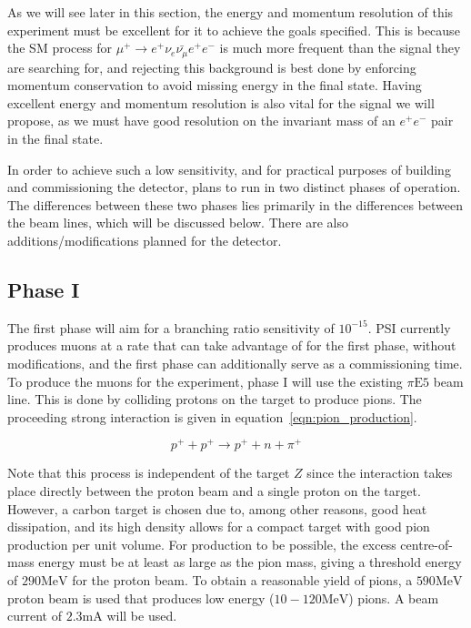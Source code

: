 As we will see later in this section, the energy and momentum resolution of this experiment must be excellent for it to achieve the goals specified.
This is because the SM process for $\mu^+ \rightarrow e^+ \nu_e \bar{\nu_\mu} e^+ e^-$ is much more frequent than the signal they are searching for, and rejecting this background is best done by enforcing momentum conservation to avoid missing energy in the final state.
Having excellent energy and momentum resolution is also vital for the signal we will propose, as we must have good resolution on the invariant mass of an $e^+ e^-$ pair in the final state.

In order to achieve such a low sensitivity, and for practical purposes of building and commissioning the detector, \mueee plans to run in two distinct phases of operation.
The differences between these two phases lies primarily in the differences between the beam lines, which will be discussed below.
There are also additions/modifications planned for the detector.

\subsection{Phase I}
The first phase will aim for a branching ratio sensitivity of $10^{-15}$.
PSI currently produces muons at a rate that \mueee can take advantage of for the first phase, without modifications, and the first phase can additionally serve as a commissioning time.
To produce the muons for the experiment, phase I will use the existing $\pi\textrm{E5}$ beam line.
This is done by colliding protons on the target to produce pions.
The proceeding strong interaction is given in equation~\ref{eqn:pion_production}.

\begin{equation}
\label{eqn:pion_production}
p^+ + p^+ \rightarrow p^+ + n + \pi^+
\end{equation}

\noindent Note that this process is independent of the target $Z$ since the interaction takes place directly between the proton beam and a single proton on the target.
However, a carbon target is chosen due to, among other reasons, good heat dissipation, and its high density allows for a compact target with good pion production per unit volume.
For production to be possible, the excess centre-of-mass energy must be at least as large as the pion mass, giving a threshold energy of $290\textrm{MeV}$ for the proton beam.
To obtain a reasonable yield of pions, a $590\textrm{MeV}$ proton beam is used that produces low energy ($10-120\textrm{MeV}$) pions.
A beam current of $2.3\textrm{mA}$ will be used.

